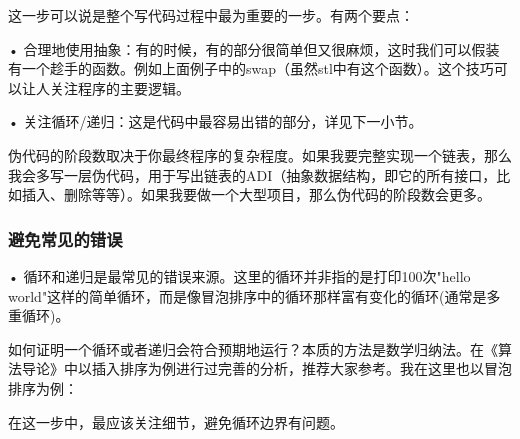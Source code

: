 \documentclass[UTF8]{ctexart}
\begin{document}
这一步可以说是整个写代码过程中最为重要的一步。有两个要点：

• 合理地使用抽象：有的时候，有的部分很简单但又很麻烦，这时我们可以假装有一个趁手的函数。例如上面例子中的swap（虽然stl中有这个函数）。这个技巧可以让人关注程序的主要逻辑。

• 关注循环/递归：这是代码中最容易出错的部分，详见下一小节。

伪代码的阶段数取决于你最终程序的复杂程度。如果我要完整实现一个链表，那么我会多写一层伪代码，用于写出链表的ADI（抽象数据结构，即它的所有接口，比如插入、删除等等）。如果我要做一个大型项目，那么伪代码的阶段数会更多。

\subsubsection{避免常见的错误}
• 循环和递归是最常见的错误来源。这里的循环并非指的是打印100次"hello world"这样的简单循环，而是像冒泡排序中的循环那样富有变化的循环(通常是多重循环)。

如何证明一个循环或者递归会符合预期地运行？本质的方法是数学归纳法。在《算法导论》中以插入排序为例进行过完善的分析，推荐大家参考。我在这里也以冒泡排序为例：


在这一步中，最应该关注细节，避免循环边界有问题。
\end{document}
